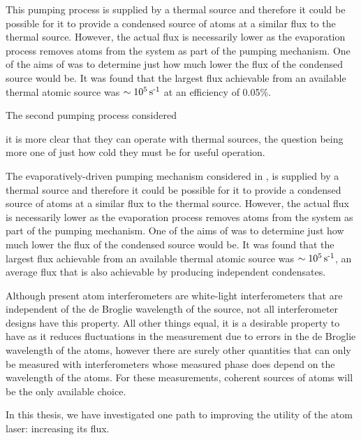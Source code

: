 This pumping process is supplied by a thermal source and therefore it could be possible for it to provide a condensed source of atoms at a similar flux to the thermal source.  However, the actual flux is necessarily lower as the evaporation process removes atoms from the system as part of the pumping mechanism.  One of the aims of  was to determine just how much lower the flux of the condensed source would be.  It was found that the largest flux achievable from an available thermal atomic source was $\sim\unit[10^5]{s\textsuperscript{-1}}$ at an efficiency of 0.05\%.

The second pumping process considered




it is more clear that they can operate with thermal sources, the question being more one of just how cold they must be for useful operation.

The evaporatively-driven pumping mechanism considered in , is supplied by a thermal source and therefore it could be possible for it to provide a condensed source of atoms at a similar flux to the thermal source.  However, the actual flux is necessarily lower as the evaporation process removes atoms from the system as part of the pumping mechanism.  One of the aims of  was to determine just how much lower the flux of the condensed source would be.  It was found that the largest flux achievable from an available thermal atomic source was $\sim\unit[10^5]{s\textsuperscript{-1}}$, an average flux that is also achievable by producing independent condensates.





Although present atom interferometers are white-light interferometers that are independent of the de Broglie wavelength of the source, not all interferometer designs have this property.  All other things equal, it is a desirable property to have as it reduces fluctuations in the measurement due to errors in the de Broglie wavelength of the atoms, however there are surely other quantities that can only be measured with interferometers whose measured phase does depend on the wavelength of the atoms.  For these measurements, coherent sources of atoms will be the only available choice.

In this thesis, we have investigated one path to improving the utility of the atom laser: increasing its flux.

